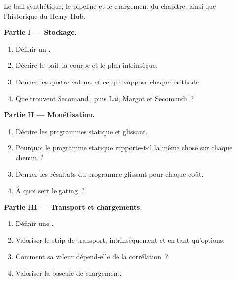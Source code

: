 \begin{problem}\label{pb:s2:storage-transport-and-physical-optionality:1}
Le bail synthétique, le pipeline et le chargement du chapitre, ainsi que l'historique du Henry Hub.

\medskip\noindent\textbf{Partie I --- Stockage.}
\begin{enumerate}
\item Définir un .
\item Décrire le bail, la courbe et le plan intrinsèque.
\item Donner les quatre valeurs et ce que suppose chaque méthode.
\item Que trouvent Secomandi, puis Lai, Margot et Secomandi~?
\end{enumerate}

\medskip\noindent\textbf{Partie II --- Monétisation.}
\begin{enumerate}[resume]
\item Décrire les programmes statique et glissant.
\item Pourquoi le programme statique rapporte-t-il la même chose sur chaque chemin~?
\item Donner les résultats du programme glissant pour chaque coût.
\item À quoi sert le gating~?
\end{enumerate}

\medskip\noindent\textbf{Partie III --- Transport et chargements.}
\begin{enumerate}[resume]
\item Définir une .
\item Valoriser le strip de transport, intrinsèquement et en tant qu'options.
\item Comment sa valeur dépend-elle de la corrélation~?
\item Valoriser la bascule de chargement.
\end{enumerate}


\end{problem}
